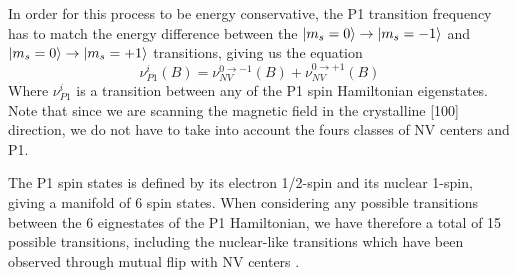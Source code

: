 \documentclass{article}
\begin{document}
In order for this process to be energy conservative, the P1 transition frequency has to match the energy difference between the $\ket{m_s=0} \to \ket{m_s=-1}$ and $\ket{m_s=0} \to \ket{m_s=+1}$ transitions, giving us the equation \begin{equation}
\label{eq_P1}
\nu^i_{P1}(B)=\nu^{0 \to -1}_{NV}(B)+\nu^{0 \to +1}_{NV}(B)
\end{equation}
Where $\nu^i_{P1}$ is a transition between any of the P1 spin Hamiltonian eigenstates. Note that since we are scanning the magnetic field in the crystalline [100] direction, we do not have to take into account the fours classes of NV centers and P1.

The P1 spin states is defined by its  electron 1/2-spin and its nuclear 1-spin, giving a manifold of 6 spin states. When considering any possible transitions between the 6 eignestates of the P1 Hamiltonian, we have therefore a total of 15 possible transitions, including the nuclear-like transitions which have been observed through mutual flip with NV centers \citep{alfasi2019detection}. 
\end{document}
